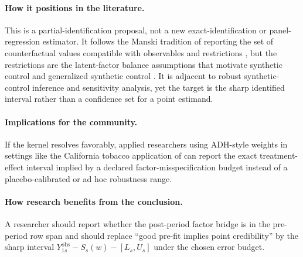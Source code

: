 \documentclass[11pt]{article}
\theoremstyle{definition}
\theoremstyle{plain}
\theoremstyle{remark}
\begin{document}
\paragraph{How it positions in the literature.}
This is a partial-identification proposal, not a new exact-identification or panel-regression estimator. It follows the Manski tradition of reporting the set of counterfactual values compatible with observables and restrictions \citep{Manski1990}, but the restrictions are the latent-factor balance assumptions that motivate synthetic control \citep{AbadieDiamondHainmueller2010,Abadie2021} and generalized synthetic control \citep{Xu2017}. It is adjacent to robust synthetic-control inference and sensitivity analysis, yet the target is the sharp identified interval rather than a confidence set for a point estimand.

\paragraph{Implications for the community.}
If the kernel resolves favorably, applied researchers using ADH-style weights in settings like the California tobacco application of \citet{AbadieDiamondHainmueller2010} can report the exact treatment-effect interval implied by a declared factor-misspecification budget instead of a placebo-calibrated or ad hoc robustness range.

\paragraph{How research benefits from the conclusion.}
A researcher should report whether the post-period factor bridge is in the pre-period row span and should replace ``good pre-fit implies point credibility'' by the sharp interval \(Y^{\mathrm{obs}}_{1s}-S_s(w)-[L_s,U_s]\) under the chosen error budget.
\end{document}
